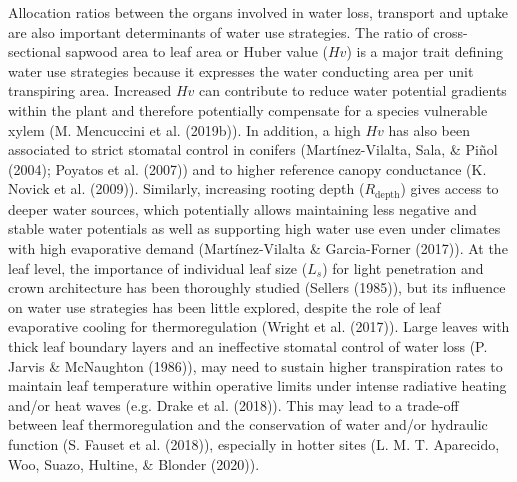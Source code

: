 \documentclass[11pt,twoside]{reedthesis}
\begin{document}
Allocation ratios between the organs involved in water loss, transport
and uptake are also important determinants of water use strategies. The
ratio of cross-sectional sapwood area to leaf area or Huber value
(\(Hv\)) is a major trait defining water use strategies because it
expresses the water conducting area per unit transpiring area. Increased
\(Hv\) can contribute to reduce water potential gradients within the
plant and therefore potentially compensate for a species vulnerable
xylem (M. Mencuccini et al. (2019b)). In addition, a high \(Hv\) has
also been associated to strict stomatal control in conifers
(Martínez-Vilalta, Sala, \& Piñol (2004); Poyatos et al. (2007)) and to
higher reference canopy conductance (K. Novick et al. (2009)).
Similarly, increasing rooting depth (\(R_{\text{depth}}\)) gives access
to deeper water sources, which potentially allows maintaining less
negative and stable water potentials as well as supporting high water
use even under climates with high evaporative demand (Martínez-Vilalta
\& Garcia-Forner (2017)). At the leaf level, the importance of
individual leaf size (\(L_s\)) for light penetration and crown
architecture has been thoroughly studied (Sellers (1985)), but its
influence on water use strategies has been little explored, despite the
role of leaf evaporative cooling for thermoregulation (Wright et al.
(2017)). Large leaves with thick leaf boundary layers and an ineffective
stomatal control of water loss (P. Jarvis \& McNaughton (1986)), may
need to sustain higher transpiration rates to maintain leaf temperature
within operative limits under intense radiative heating and/or heat
waves (e.g. Drake et al. (2018)). This may lead to a trade-off between
leaf thermoregulation and the conservation of water and/or hydraulic
function (S. Fauset et al. (2018)), especially in hotter sites (L. M. T.
Aparecido, Woo, Suazo, Hultine, \& Blonder (2020)).\par
\end{document}
